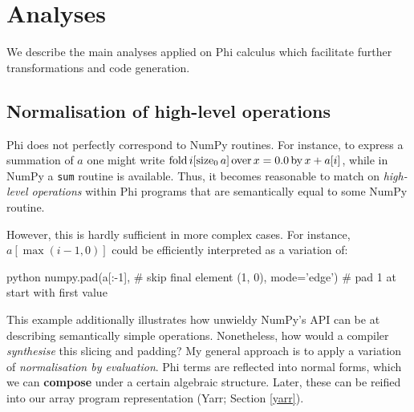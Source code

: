 

\section{Analyses}
\label{compiler-analyses}

We describe the main analyses applied on Phi calculus which facilitate further transformations and code generation. 

\subsection{Normalisation of high-level operations}

Phi does not perfectly correspond to NumPy routines. For instance, to express a summation of $a$ one might write $\phifold{i}{\phisize{a}{0}}{x}{0.0}{x + a[i]}$, while in NumPy a \texttt{sum} routine is available. Thus, it becomes reasonable to match on \textit{high-level operations} within Phi programs that are semantically equal to some NumPy routine.

However, this is hardly sufficient in more complex cases. For instance, $a[\max(i - 1, 0)]$ could be efficiently interpreted as a variation of:
\begin{center}
\begin{cminted}{python}
numpy.pad(a[:-1],               # skip final element
          (1, 0), mode='edge')  # pad 1 at start with first value
\end{cminted}
\end{center}
This example additionally illustrates how unwieldy NumPy's API can be at describing semantically simple operations. Nonetheless, how would a compiler \textit{synthesise} this slicing and padding? My general approach is to apply a variation of \textit{normalisation by evaluation}. Phi terms are reflected into normal forms, which we can \textbf{compose} under a certain algebraic structure. Later, these can be reified into our array program representation (Yarr; Section \ref{yarr}).

